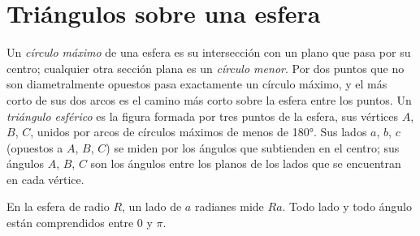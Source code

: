 \section{Triángulos sobre una esfera}

\begin{definition}\label{def:b1:spherical-astronomy:spherical-triangle}
Un \emph{círculo máximo} de una esfera es su intersección
con un plano que pasa por su centro; cualquier otra sección plana es un
\emph{círculo menor}. Por dos puntos que no son
diametralmente opuestos pasa exactamente un círculo máximo, y el más corto de
sus dos arcos es el camino más corto sobre la esfera entre los puntos. Un
\emph{triángulo esférico} es la figura formada por tres
puntos de la esfera, sus vértices $A$, $B$, $C$, unidos por arcos de círculos
máximos de menos de \ang{180}. Sus lados $a$, $b$, $c$ (opuestos a $A$, $B$,
$C$) se miden por los ángulos que subtienden en el centro; sus ángulos $A$,
$B$, $C$ son los ángulos entre los planos de los lados que se encuentran en
cada vértice.
\end{definition}

En la esfera de radio $R$, un lado de $a$ radianes mide $Ra$. Todo lado y todo
ángulo están comprendidos entre $0$ y $\pi$.

